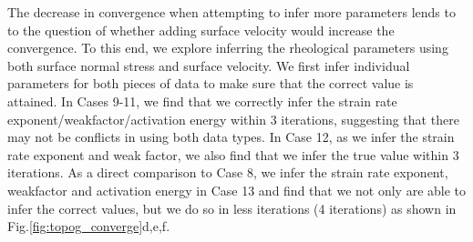 \documentclass[12pt]{article}
\begin{document}
The decrease in convergence when attempting to infer more parameters lends to to the question  of whether adding surface velocity would increase the convergence. To this end, we explore inferring the rheological parameters using both surface normal stress and surface velocity. We first infer individual parameters for both pieces of data to make sure that the correct value is attained. In Cases 9-11, we find that we correctly infer the strain rate exponent/weakfactor/activation energy within 3 iterations, suggesting that there may not be conflicts in using both data types. In Case 12, as we infer the strain rate exponent and weak factor, we also find that we infer the true value within 3 iterations. As a direct comparison to Case 8, we infer the strain rate exponent, weakfactor and activation energy in Case 13 and find that we not only are able to infer the correct values, but we do so in less iterations (4 iterations) as shown in Fig.\ref{fig:topog_converge}d,e,f.
\end{document}
